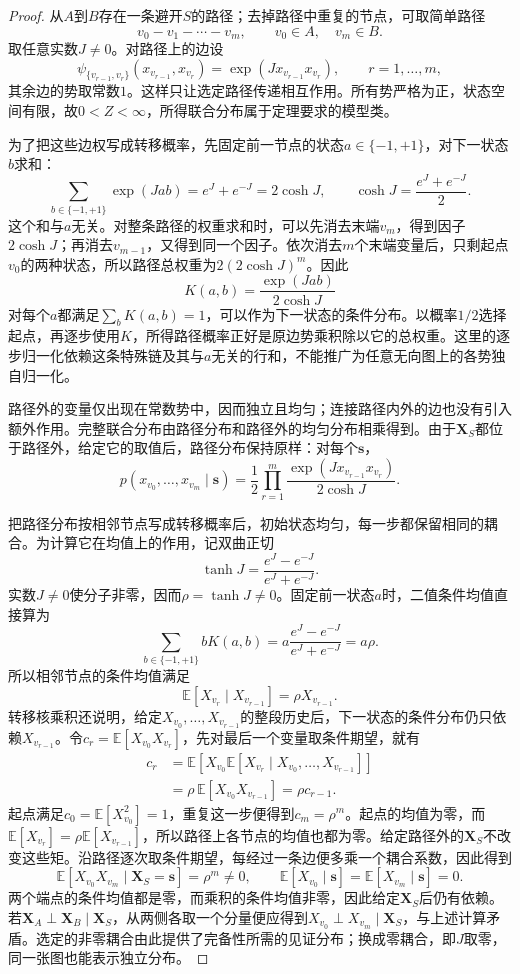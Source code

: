 \begin{proof}
从$A$到$B$存在一条避开$S$的路径；去掉路径中重复的节点，可取简单路径
\[
  v_0-v_1-\cdots-v_m,
  \qquad v_0\in A,\quad v_m\in B.
\]
取任意实数$J\neq0$。对路径上的边设
\[
  \psi_{\{v_{r-1},v_r\}}(x_{v_{r-1}},x_{v_r})
  =\exp(Jx_{v_{r-1}}x_{v_r}),
  \qquad r=1,\ldots,m,
\]
其余边的势取常数$1$。这样只让选定路径传递相互作用。所有势严格为正，状态空间有限，故$0<Z<\infty$，所得联合分布属于定理要求的模型类。

为了把这些边权写成转移概率，先固定前一节点的状态$a\in\{-1,+1\}$，对下一状态$b$求和：
\[
  \sum_{b\in\{-1,+1\}}\exp(Jab)
  =e^J+e^{-J}=2\cosh J,
  \qquad \cosh J=\frac{e^J+e^{-J}}{2}.
\]
这个和与$a$无关。对整条路径的权重求和时，可以先消去末端$v_m$，得到因子$2\cosh J$；再消去$v_{m-1}$，又得到同一个因子。依次消去$m$个末端变量后，只剩起点$v_0$的两种状态，所以路径总权重为$2(2\cosh J)^m$。因此
\[
  K(a,b)=\frac{\exp(Jab)}{2\cosh J}
\]
对每个$a$都满足$\sum_bK(a,b)=1$，可以作为下一状态的条件分布。以概率$1/2$选择起点，再逐步使用$K$，所得路径概率正好是原边势乘积除以它的总权重。这里的逐步归一化依赖这条特殊链及其与$a$无关的行和，不能推广为任意无向图上的各势独自归一化。

路径外的变量仅出现在常数势中，因而独立且均匀；连接路径内外的边也没有引入额外作用。完整联合分布由路径分布和路径外的均匀分布相乘得到。由于$\bm{X}_S$都位于路径外，给定它的取值后，路径分布保持原样：对每个$\bm{s}$，
\[
  p(x_{v_0},\ldots,x_{v_m}\mid\bm{s})
  =\frac12\prod_{r=1}^{m}
    \frac{\exp(Jx_{v_{r-1}}x_{v_r})}{2\cosh J}.
\]

把路径分布按相邻节点写成转移概率后，初始状态均匀，每一步都保留相同的耦合。为计算它在均值上的作用，记双曲正切
\[
  \tanh J=\frac{e^J-e^{-J}}{e^J+e^{-J}}.
\]
实数$J\neq0$使分子非零，因而$\rho=\tanh J\neq0$。固定前一状态$a$时，二值条件均值直接算为
\[
  \sum_{b\in\{-1,+1\}}bK(a,b)
  =a\frac{e^J-e^{-J}}{e^J+e^{-J}}
  =a\rho.
\]
所以相邻节点的条件均值满足
\[
  \mathbb{E}[X_{v_r}\mid X_{v_{r-1}}]
  =\rho X_{v_{r-1}}.
\]
转移核乘积还说明，给定$X_{v_0},\ldots,X_{v_{r-1}}$的整段历史后，下一状态的条件分布仍只依赖$X_{v_{r-1}}$。令$c_r=\mathbb{E}[X_{v_0}X_{v_r}]$，先对最后一个变量取条件期望，就有
\[
  \begin{aligned}
    c_r
    &=\mathbb{E}\!\left[
        X_{v_0}\mathbb{E}[X_{v_r}\mid
        X_{v_0},\ldots,X_{v_{r-1}}]\right]\\
    &=\rho\,\mathbb{E}[X_{v_0}X_{v_{r-1}}]
      =\rho c_{r-1}.
  \end{aligned}
\]
起点满足$c_0=\mathbb{E}[X_{v_0}^2]=1$，重复这一步便得到$c_m=\rho^m$。起点的均值为零，而$\mathbb{E}[X_{v_r}]=\rho\mathbb{E}[X_{v_{r-1}}]$，所以路径上各节点的均值也都为零。给定路径外的$\bm{X}_S$不改变这些矩。沿路径逐次取条件期望，每经过一条边便多乘一个耦合系数，因此得到
\[
  \mathbb{E}[X_{v_0}X_{v_m}\mid\bm{X}_S=\bm{s}]
  =\rho^m\neq0,
  \qquad
  \mathbb{E}[X_{v_0}\mid\bm{s}]
  =\mathbb{E}[X_{v_m}\mid\bm{s}]=0.
\]
两个端点的条件均值都是零，而乘积的条件均值非零，因此给定$\bm{X}_S$后仍有依赖。若$\bm{X}_A\perp\bm{X}_B\mid\bm{X}_S$，从两侧各取一个分量便应得到$X_{v_0}\perp X_{v_m}\mid\bm{X}_S$，与上述计算矛盾。选定的非零耦合由此提供了完备性所需的见证分布；换成零耦合，即$J$取零，同一张图也能表示独立分布。
\end{proof}


